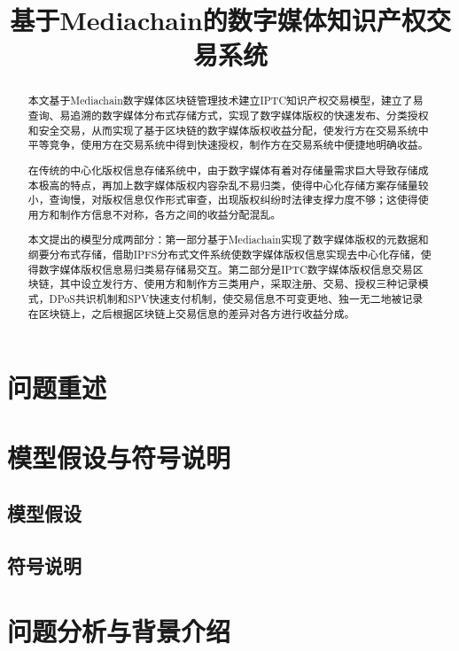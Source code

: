 \documentclass[withoutpreface,bwprint]{cumcmthesis} %
\title{基于Mediachain的数字媒体知识产权交易系统}
\begin{document}
 \maketitle
 \begin{abstract}
本文基于Mediachain数字媒体区块链管理技术建立IPTC知识产权交易模型，建立了易查询、易追溯的数字媒体分布式存储方式，实现了数字媒体版权的快速发布、分类授权和安全交易，从而实现了基于区块链的数字媒体版权收益分配，使发行方在交易系统中平等竞争，使用方在交易系统中得到快速授权，制作方在交易系统中便捷地明确收益。

在传统的中心化版权信息存储系统中，由于数字媒体有着对存储量需求巨大导致存储成本极高的特点，再加上数字媒体版权内容杂乱不易归类，使得中心化存储方案存储量较小，查询慢，对版权信息仅作形式审查，出现版权纠纷时法律支撑力度不够；这使得使用方和制作方信息不对称，各方之间的收益分配混乱。

本文提出的模型分成两部分：第一部分基于Mediachain实现了数字媒体版权的元数据和纲要分布式存储，借助IPFS分布式文件系统使数字媒体版权信息实现去中心化存储，使得数字媒体版权信息易归类易存储易交互。第二部分是IPTC数字媒体版权信息交易区块链，其中设立发行方、使用方和制作方三类用户，采取注册、交易、授权三种记录模式，DPoS共识机制和SPV快速支付机制，使交易信息不可变更地、独一无二地被记录在区块链上，之后根据区块链上交易信息的差异对各方进行收益分成。


\end{abstract}

\tableofcontents

\newpage

\section{问题重述}

\section{模型假设与符号说明}
\subsection{模型假设}
\subsection{符号说明}

\section{问题分析与背景介绍}
\end{document}
